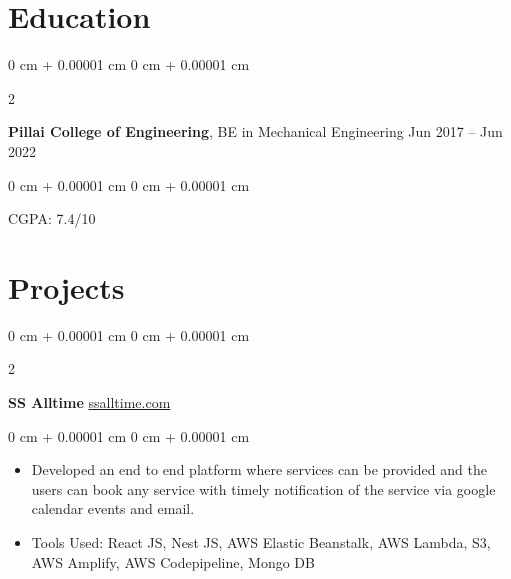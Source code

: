 \documentclass[10pt, letterpaper]{article}
\newenvironment{highlights}{
    \begin{itemize}[
        topsep=0.10 cm,
        parsep=0.10 cm,
        partopsep=0pt,
        itemsep=0pt,
        leftmargin=0 cm + 10pt
    ]
}{
    \end{itemize}
} %
\newenvironment{onecolentry}{
    \begin{adjustwidth}{
        0 cm + 0.00001 cm
    }{
        0 cm + 0.00001 cm
    }
}{
    \end{adjustwidth}
} %
\newenvironment{twocolentry}[2][]{
    \onecolentry
    \def\secondColumn{#2}
    \setcolumnwidth{\fill, 4.5 cm}
    \begin{paracol}{2}
}{
    \switchcolumn \raggedleft \secondColumn
    \end{paracol}
    \endonecolentry
} %
\begin{document}
        \vspace{0.2 cm}

    \section{Education}



        
        \begin{twocolentry}{
            Jun 2017 – Jun 2022
        }
            \textbf{Pillai College of Engineering}, BE in Mechanical Engineering\end{twocolentry}

        \vspace{0.10 cm}
        \begin{onecolentry}

            CGPA: 7.4/10

        \end{onecolentry}
        \vspace{0.20 cm}




    

    \section{Projects}



        
        \begin{twocolentry}{
            \href{https://ssalltime.com}{ssalltime.com}
        }
            \textbf{SS Alltime}\end{twocolentry}

        \vspace{0.10 cm}
        \begin{onecolentry}
            \begin{highlights}
                \item Developed an end to end platform where services can be provided and the users can book any service with timely notification of the service via google calendar events and email.
                \item Tools Used: React JS, Nest JS, AWS Elastic Beanstalk, AWS Lambda, S3, AWS Amplify, AWS Codepipeline, Mongo DB
            \end{highlights}
        \end{onecolentry}


        \vspace{0.2 cm}
\end{document}
